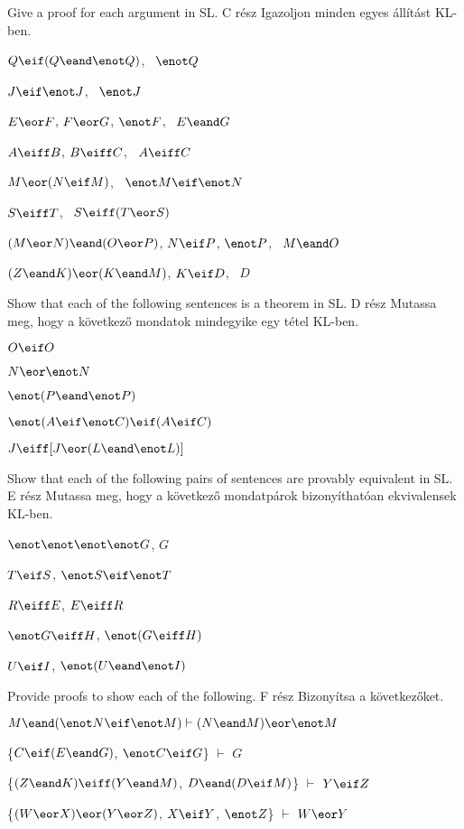\problempart
Give a proof for each argument in SL.
C rész Igazoljon minden egyes állítást KL-ben.
\begin{earg}
\item $Q\eif(Q\eand\enot Q)$, \therefore\ $\enot Q$
\item $J\eif\enot J$, \therefore\ $\enot J$
\item $E\eor F$, $F\eor G$, $\enot F$, \therefore\ $E \eand G$
\item $A\eiff B$, $B\eiff C$, \therefore\ $A\eiff C$
\item $M\eor(N\eif M)$, \therefore\ $\enot M \eif \enot N$
\item $S\eiff T$, \therefore\ $S\eiff (T\eor S)$
\item $(M \eor N) \eand (O \eor P)$, $N \eif P$, $\enot P$, \therefore\ $M\eand O$
\item $(Z\eand K) \eor (K\eand M)$, $K \eif D$, \therefore\ $D$
\end{earg}



\problempart
Show that each of the following sentences is a theorem in SL.
D rész Mutassa meg, hogy a következő mondatok mindegyike egy tétel KL-ben.
\begin{earg}
\item $O \eif O$
\item $N \eor \enot N$
\item $\enot(P\eand \enot P)$
\item $\enot(A \eif \enot C) \eif (A \eif C)$
\item $J \eiff [J\eor (L\eand\enot L)]$
\end{earg}

\problempart
Show that each of the following pairs of sentences are provably equivalent in SL.
E rész Mutassa meg, hogy a következő mondatpárok bizonyíthatóan ekvivalensek KL-ben.
\begin{earg}
\item $\enot\enot\enot\enot G$, $G$
\item $T\eif S$, $\enot S \eif \enot T$
\item $R \eiff E$, $E \eiff R$
\item $\enot G \eiff H$, $\enot(G \eiff H)$
\item $U \eif I$, $\enot(U \eand \enot I)$
\end{earg}

\problempart
Provide proofs to show each of the following.
F rész Bizonyítsa a következőket.
\begin{earg}
\item $M \eand (\enot N \eif \enot M) \vdash (N \eand M) \eor \enot M$
\item \{$C\eif(E\eand G)$, $\enot C \eif G$\} $\vdash$ $G$
\item \{$(Z\eand K)\eiff(Y\eand M)$, $D\eand(D\eif M)$\} $\vdash$ $Y\eif Z$
\item \{$(W \eor X) \eor (Y \eor Z)$, $X\eif Y$, $\enot Z$\} $\vdash$ $W\eor Y$
\end{earg}




